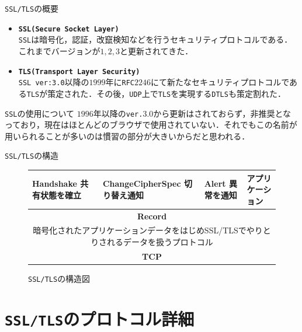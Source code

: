 \documentclass[11pt, aspectratio=169]{beamer}
\begin{document}
\begin{frame}{\texttt{SSL/TLS}の概要}
  \begin{itemize}
    \item \textbf{\texttt{SSL(Secure Socket Layer)}} \\
      \texttt{SSL}は暗号化，認証，改竄検知などを行うセキュリティプロトコルである．これまでバージョンが$1,2,3$と更新されてきた．      
     \item \textbf{\texttt{TLS(Transport Layer Security)}} \\
       \texttt{SSL ver:3.0}以降の$1999$年に\texttt{RFC}$2246$にて新たなセキュリティプロトコルである\texttt{TLS}が策定された．その後，\texttt{UDP}上で\texttt{TLS}を実現する\texttt{DTLS}も策定割れた．

  \end{itemize}
  \begin{alertblock}{\texttt{SSL}の使用について}
    $1996$年以降の\texttt{ver.}$3.0$から更新はされておらず，非推奨となっており，現在はほとんどのブラウザで使用されていない．それでもこの名前が用いられることが多いのは慣習の部分が大きいからだと思われる．
  \end{alertblock}
\end{frame}

\begin{frame}{\texttt{SSL/TLS}の構造}
  \begin{figure}
    \centering
    \begin{tabular}{|p{2.2cm}|p{2.2cm}|p{2.2cm}|p{2.2cm}|}
      \hline
      \textbf{Handshake} \newline \tiny 共有状態を確立 & \textbf{ChangeCipherSpec} \newline \tiny 切り替え通知 & \textbf{Alert} \newline \tiny 異常を通知 & \textbf{アプリケーション} \\
      \hline
      \multicolumn{4}{|c|}{\textbf{Record}} \\
      \multicolumn{4}{|c|}{\tiny 暗号化されたアプリケーションデータをはじめSSL/TLSでやりとりされるデータを扱うプロトコル} \\
      \hline
      \multicolumn{4}{|c|}{\textbf{TCP}} \\
      \hline
    \end{tabular}
    \caption{\texttt{SSL/TLS}の構造図}
  \end{figure}
\end{frame}

\section{\texttt{SSL/TLS}のプロトコル詳細}
\end{document}
